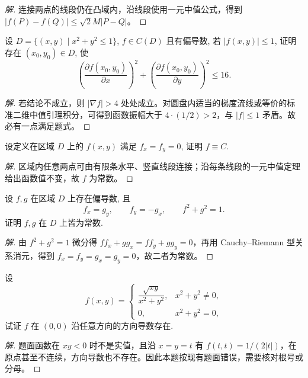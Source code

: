 \documentclass[../../数学分析培优讲义(答案版).tex]{subfiles}
\begin{document}
\begin{proof}[解]
连接两点的线段仍在凸域内，沿线段使用一元中值公式，得到 $|f(P)-f(Q)|\leq\sqrt{2}M|P-Q|$。
\end{proof}

\begin{example}
设 $D=\{(x,y)\mid x^2+y^2\leq1\}$, $f\in C(D)$ 且有偏导数, 若 $|f(x,y)|\leq1$, 证明存在 $(x_0,y_0)\in D$, 使
\[
    \left(\dfrac{\partial f(x_0,y_0)}{\partial x}\right)^2
    +\left(\dfrac{\partial f(x_0,y_0)}{\partial y}\right)^2\leq16.
\]
\end{example}

\begin{proof}[解]
若结论不成立，则 $|\nabla f|>4$ 处处成立。对圆盘内适当的梯度流线或等价的标准二维中值引理积分，可得到函数振幅大于 $4\cdot(1/2)>2$，与 $|f|\leq1$ 矛盾。故必有一点满足题式。
\end{proof}

\begin{example}
设定义在区域 $D$ 上的 $f(x,y)$ 满足 $f_x=f_y=0$, 证明 $f\equiv C$.
\end{example}

\begin{proof}[解]
区域内任意两点可由有限条水平、竖直线段连接；沿每条线段的一元中值定理给出函数值不变，故 $f$ 为常数。
\end{proof}

\begin{example}
设 $f,g$ 在区域 $D$ 上存在偏导数, 且
\[
    f_x=g_y,\qquad f_y=-g_x,\qquad f^2+g^2=1.
\]
证明 $f,g$ 在 $D$ 上皆为常数.
\end{example}

\begin{proof}[解]
由 $f^2+g^2=1$ 微分得 $ff_x+gg_x=ff_y+gg_y=0$，再用 Cauchy--Riemann 型关系消元，得到 $f_x=f_y=g_x=g_y=0$，故二者为常数。
\end{proof}

\begin{example}
设
\[
    f(x,y)=
    \begin{cases}
        \dfrac{\sqrt{xy}}{x^2+y^2}, & x^2+y^2\ne0,\\
        0, & x^2+y^2=0,
    \end{cases}
\]
试证 $f$ 在 $(0,0)$ 沿任意方向的方向导数存在.
\end{example}

\begin{proof}[解]
题面函数在 $xy<0$ 时不是实值，且沿 $x=y=t$ 有 $f(t,t)=1/(2|t|)$，在原点甚至不连续，方向导数也不存在。因此本题按现有题面错误，需要核对根号或分母。
\end{proof}
\end{document}
